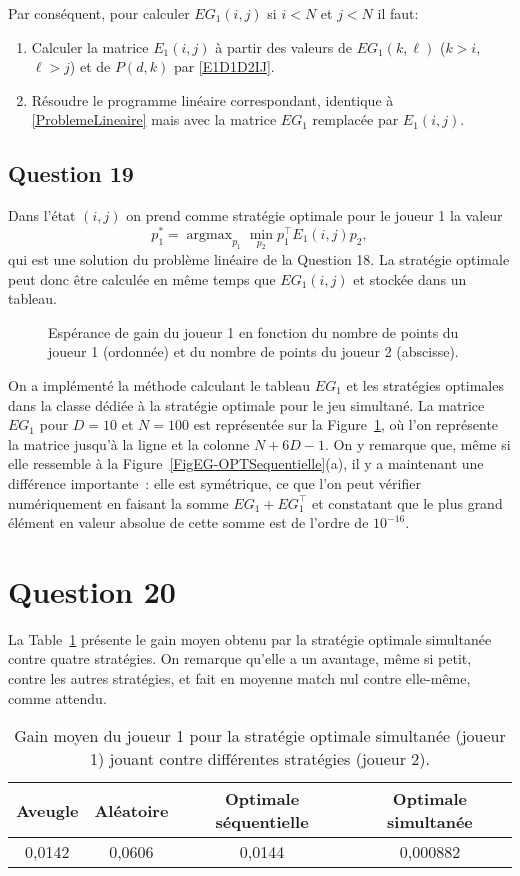 \documentclass[a4paper,11pt]{amsart}
\theoremstyle{plain}
\DeclareMathOperator*{\argmax}{argmax}
\begin{document}
Par conséquent, pour calculer $EG_1(i, j)$ si $i < N$ et $j < N$ il faut:
\begin{enumerate}[label={\arabic*.}, ref={\arabic*}, nosep]
\item Calculer la matrice $E_1(i, j)$ à partir des valeurs de $EG_1(k, \ell)$ ($k > i$, $\ell > j$) et de $P(d, k)$ par \eqref{E1D1D2IJ}.
\item Résoudre le programme linéaire correspondant, identique à \eqref{ProblemeLineaire} mais avec la matrice $EG_1$ remplacée par $E_1(i, j)$.
\end{enumerate}

\subsection{Question 19}

Dans l'état $(i, j)$ on prend comme stratégie optimale pour le joueur 1 la valeur
\[
p_1^\ast = \argmax_{p_1} \min_{p_2} p_1^\top E_1(i, j) p_2,
\]
qui est une solution du problème linéaire de la Question 18. La stratégie optimale peut donc être calculée en même temps que $EG_1(i, j)$ et stockée dans un tableau.

\begin{figure}[ht]
\centering
\resizebox{0.5\textwidth}{!}{}
\caption{Espérance de gain du joueur 1 en fonction du nombre de points du joueur 1 (ordonnée) et du nombre de points du joueur 2 (abscisse).}
\label{FigEGSimultanee}
\end{figure}

On a implémenté la méthode calculant le tableau $EG_1$ et les stratégies optimales dans la classe dédiée à la stratégie optimale pour le jeu simultané. La matrice $EG_1$ pour $D = 10$ et $N = 100$ est représentée sur la Figure~\ref{FigEGSimultanee}, où l'on représente la matrice jusqu'à la ligne et la colonne $N + 6D - 1$. On y remarque que, même si elle ressemble à la Figure~\ref{FigEG-OPTSequentielle}(a), il y a maintenant une différence importante~: elle est symétrique, ce que l'on peut vérifier numériquement en faisant la somme $EG_1 + EG_1^\top$ et constatant que le plus grand élément en valeur absolue de cette somme est de l'ordre de $10^{-16}$.

\section{Question 20}

La Table~\ref{TabSimultanee} présente le gain moyen obtenu par la stratégie optimale simultanée contre quatre stratégies. On remarque qu'elle a un avantage, même si petit, contre les autres stratégies, et fait en moyenne match nul contre elle-même, comme attendu.

\begin{table}[ht]
\begin{tabular}{|cccc|}
\hline
Aveugle & Aléatoire & Optimale séquentielle & Optimale simultanée \tabularnewline
\hline
0,0142 & 0,0606 & 0,0144 & 0,000882 \tabularnewline
\hline
\end{tabular}
\caption{Gain moyen du joueur 1 pour la stratégie optimale simultanée (joueur 1) jouant contre différentes stratégies (joueur 2).}
\label{TabSimultanee}
\end{table}
\end{document}
